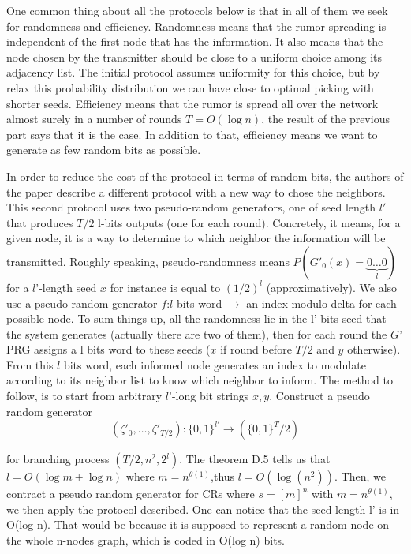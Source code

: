 \documentclass[10pt,journal,a4paper]{IEEEtran}
\begin{document}
One common thing about all  the protocols below is that in all of them we seek for randomness and efficiency. Randomness means that the rumor spreading is independent of the first node that has the information. It also means that the node chosen by the transmitter should be close to a uniform choice among its adjacency list. The initial protocol assumes uniformity for this choice, but by relax this probability distribution we can have close to optimal picking with shorter seeds. Efficiency means that the rumor is spread all over the network almost surely in a number of rounds $T=O(\log n)$, the result of the previous part says that it is the case. In addition to that, efficiency means we want to generate as few random bits as possible.

In order to reduce the cost of the protocol in terms of random bits, the authors of the paper describe a different protocol with a new way to chose the neighbors. This second protocol uses two pseudo-random generators, one of seed length $l'$ that produces $T/2 $ l-bits outputs (one for each round). Concretely, it means, for a given node, it is a way to determine to which neighbor the information will be transmitted. Roughly speaking, pseudo-randomness means $P(G'_0(x)=\underbrace{0\dots0}_l)$ for a $l’$-length seed $x$ for instance is equal to $(1/2)^l$ (approximatively). We also use a pseudo random generator $f$:$l$-bits word $\to$ an index modulo delta for each possible node. To sum things up, all the randomness lie in the l’ bits seed that the system generates (actually there are two of them), then for each round the $G’$ PRG assigns a l bits word to these seeds ($x$ if round before $T/2$ and $y$ otherwise). From this $l$ bits word, each informed node generates an index to modulate according to its neighbor list to know which neighbor to inform.
 The method to follow, is to start from arbitrary $l’$-long bit strings $x,y$. Construct a pseudo random generator
  \[
    ( \zeta'_{0}, \dots, \zeta'_{T/2}): \{ 0,1 \}^{l'} \to ( \{0,1\}^T/2 )
   \]
 
for branching process $(T/2,n^2,2^l)$. The theorem D.5 tells us that $l=O(\log m+\log n)$ where $m=n^{\theta(1)}$,thus $l=O(\log(n^2))$. Then, we contract a pseudo random generator for CRs where $s=[m]^n$ with $m=n^{\theta(1)}$, we then apply the protocol described. One can notice that the seed length l’ is in O(log n). That would be because it is supposed to represent a random node on the whole n-nodes graph, which is coded in O(log n) bits.
 
\end{document}
